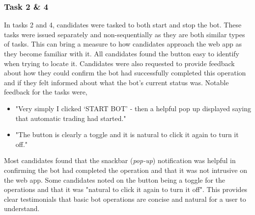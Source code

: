 
\subsubsection{Task 2 \& 4}
\label{sec:evaluation:ui:tasks:q2_q4}
\noindent In tasks 2 and 4, candidates were tasked to both start and stop the bot. These tasks were issued separately and non-sequentially as they are both similar types of tasks. This can bring a measure to how candidates approach the web app as they become familiar with it. All candidates found the button easy to identify when trying to locate it. Candidates were also requested to provide feedback about how they could confirm the bot had successfully completed this operation and if they felt informed about what the bot's current status was. Notable feedback for the tasks were,
\begin{itemize}
\item "Very simply I clicked `START BOT' - then a helpful pop up displayed saying that automatic trading had started."
\item "The button is clearly a toggle and it is natural to click it again to turn it off."
\end{itemize}
Most candidates found that the snackbar (\textit{pop-up}) notification was helpful in confirming the bot had completed the operation and that it was not intrusive on the web app. Some candidates noted on the button being a toggle for the operations and that it was "natural to click it again to turn it off". This provides clear testimonials that basic bot operations are concise and natural for a user to understand.

